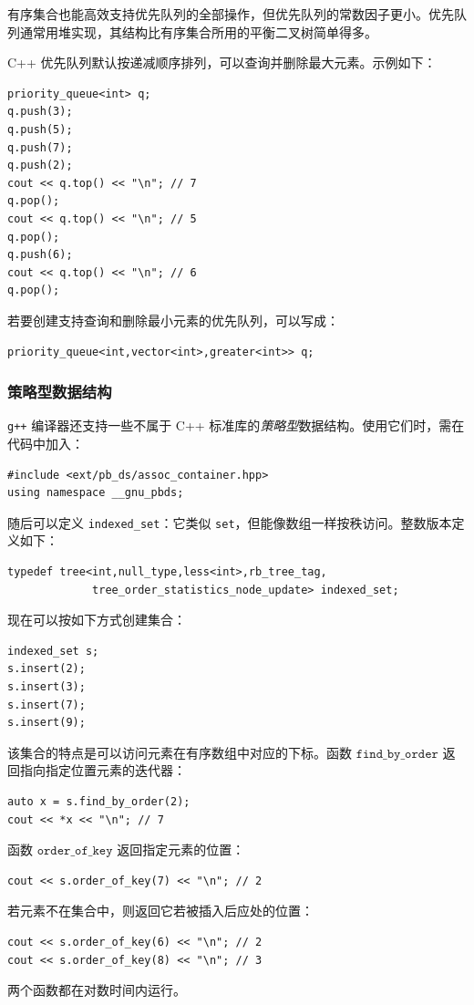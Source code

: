 有序集合也能高效支持优先队列的全部操作，但优先队列的常数因子更小。优先队列通常用堆实现，其结构比有序集合所用的平衡二叉树简单得多。

\begin{samepage}
C++ 优先队列默认按递减顺序排列，可以查询并删除最大元素。示例如下：

\begin{lstlisting}
priority_queue<int> q;
q.push(3);
q.push(5);
q.push(7);
q.push(2);
cout << q.top() << "\n"; // 7
q.pop();
cout << q.top() << "\n"; // 5
q.pop();
q.push(6);
cout << q.top() << "\n"; // 6
q.pop();
\end{lstlisting}
\end{samepage}

若要创建支持查询和删除最小元素的优先队列，可以写成：

\begin{lstlisting}
priority_queue<int,vector<int>,greater<int>> q;
\end{lstlisting}

\subsubsection{策略型数据结构}

\texttt{g++} 编译器还支持一些不属于 C++ 标准库的\emph{策略型}数据结构。使用它们时，需在代码中加入：
\begin{lstlisting}
#include <ext/pb_ds/assoc_container.hpp>
using namespace __gnu_pbds; 
\end{lstlisting}
随后可以定义 \texttt{indexed\_set}：它类似 \texttt{set}，但能像数组一样按秩访问。整数版本定义如下：
\begin{lstlisting}
typedef tree<int,null_type,less<int>,rb_tree_tag,
             tree_order_statistics_node_update> indexed_set; 
\end{lstlisting}
现在可以按如下方式创建集合：
\begin{lstlisting}
indexed_set s;
s.insert(2);
s.insert(3);
s.insert(7);
s.insert(9);
\end{lstlisting}
该集合的特点是可以访问元素在有序数组中对应的下标。函数 $\texttt{find\_by\_order}$ 返回指向指定位置元素的迭代器：
\begin{lstlisting}
auto x = s.find_by_order(2);
cout << *x << "\n"; // 7
\end{lstlisting}
函数 $\texttt{order\_of\_key}$ 返回指定元素的位置：
\begin{lstlisting}
cout << s.order_of_key(7) << "\n"; // 2
\end{lstlisting}
若元素不在集合中，则返回它若被插入后应处的位置：
\begin{lstlisting}
cout << s.order_of_key(6) << "\n"; // 2
cout << s.order_of_key(8) << "\n"; // 3
\end{lstlisting}
两个函数都在对数时间内运行。


